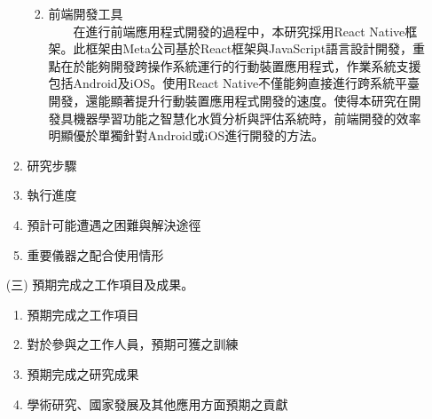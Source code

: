 \documentclass[12pt,a4paper]{article}
\begin{document}
\begin{enumerate}
\begin{enumerate}[label=\arabic*.]
\begin{enumerate}[label=2-1-\arabic*.]
\begin{enumerate}[label=\Alph*.]
            \end{enumerate}
        \item 前端開發工具\\
        　　在進行前端應用程式開發的過程中，本研究採用React Native框架。此框架由Meta公司基於React框架與JavaScript語言設計開發，重點在於能夠開發跨操作系統運行的行動裝置應用程式，作業系統支援包括Android及iOS\cite{ref23}。使用React Native不僅能夠直接進行跨系統平臺開發，還能顯著提升行動裝置應用程式開發的速度。使得本研究在開發具機器學習功能之智慧化水質分析與評估系統時，前端開發的效率明顯優於單獨針對Android或iOS進行開發的方法。
    \end{enumerate}
\item 研究步驟\\
\item 執行進度\\
\item 預計可能遭遇之困難與解決途徑\\
\item 重要儀器之配合使用情形\\
\end{enumerate}

\item[(三)] 預期完成之工作項目及成果。
\begin{enumerate}[label=\arabic*.]
\item 預期完成之工作項目\\
\item 對於參與之工作人員，預期可獲之訓練\\
\item 預期完成之研究成果\\
\item 學術研究、國家發展及其他應用方面預期之貢獻\\
\end{enumerate}


\end{enumerate}
\end{document}
